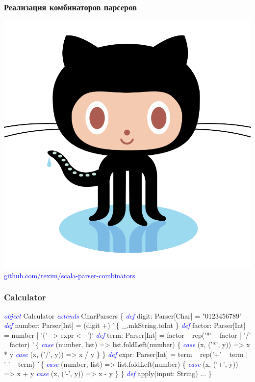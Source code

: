 \documentclass{beamer}
\newcommand{\keyword}[1]{\textcolor{blue}{\textsl{#1}}}
\begin{document}
\begin{frame}
  \frametitle{Реализация комбинаторов парсеров}
  \includegraphics[scale=0.04]{images/octocat.png} \Large \textcolor{blue}{github.com{\huge /rexim/}scala-parser-combinators}
\end{frame}

\begin{frame}[fragile]
  \frametitle{Calculator}
\scriptsize
  \begin{semiverbatim}
\keyword{object} Calculator \keyword{extends} CharParsers \{
  \keyword{def} digit: Parser[Char] = "0123456789"
  \keyword{def} number: Parser[Int] = (digit +) ^^ \{ _.mkString.toInt \}
  \keyword{def} factor: Parser[Int] = number | '(' ~> expr <~ ')'
  \keyword{def} term: Parser[Int] = factor ~ rep('*' ~ factor | '/' ~ factor) ^^ \{
    \keyword{case} (number, list) => list.foldLeft(number) \{
      \keyword{case} (x, ('*', y)) => x * y
      \keyword{case} (x, ('/', y)) => x / y
    \}
  \}
  \keyword{def} expr: Parser[Int] = term ~ rep('+' ~ term | '-' ~ term) ^^ \{
    \keyword{case} (number, list) => list.foldLeft(number) \{
      \keyword{case} (x, ('+', y)) => x + y
      \keyword{case} (x, ('-', y)) => x - y
    \}
  \}
  \keyword{def} apply(input: String) { ... }
\}
  \end{semiverbatim}
\end{frame}
\end{document}
